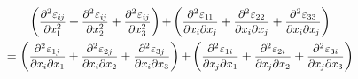 \noindent
{}

\nopagebreak\vspace{-0.2em}
\begin{multline*}
\biggl(
\scalebox{.9}{$ \displaystyle \frac{\partial^2 \infinitesimaldeformationcomponents{i\hspace{-0.1ex}j}}{\partial x_1^2} $}
+ \scalebox{.9}{$ \displaystyle \frac{\partial^2 \infinitesimaldeformationcomponents{i\hspace{-0.1ex}j}}{\partial x_2^2} $}
+ \scalebox{.9}{$ \displaystyle \frac{\partial^2 \infinitesimaldeformationcomponents{i\hspace{-0.1ex}j}}{\partial x_3^2} $}
\biggr)
\hspace{-0.2ex} + \hspace{-0.2ex}
\biggl(
\scalebox{.9}{$ \displaystyle \frac{\partial^2 \infinitesimaldeformationcomponents{1\hspace{-0.1ex}1}}{\partial x_{i} \partial x_{\hspace{-0.1ex}j}} $}
+ \scalebox{.9}{$ \displaystyle \frac{\partial^2 \infinitesimaldeformationcomponents{22}}{\partial x_{i} \partial x_{\hspace{-0.1ex}j}} $}
+ \scalebox{.9}{$ \displaystyle \frac{\partial^2 \infinitesimaldeformationcomponents{33}}{\partial x_{i} \partial x_{\hspace{-0.1ex}j}} $}
\biggr)
\\
%
=
\biggl(
\scalebox{.9}{$ \displaystyle \frac{\partial^2 \infinitesimaldeformationcomponents{1 j}}{\partial x_{i} \partial x_{1}} $}
+ \scalebox{.9}{$ \displaystyle \frac{\partial^2 \infinitesimaldeformationcomponents{2 j}}{\partial x_{i} \partial x_{2}} $}
+ \scalebox{.9}{$ \displaystyle \frac{\partial^2 \infinitesimaldeformationcomponents{3 j}}{\partial x_{i} \partial x_{3}} $}
\biggr)
\hspace{-0.2ex} + \hspace{-0.2ex}
\biggl(
\scalebox{.9}{$ \displaystyle \frac{\partial^2 \infinitesimaldeformationcomponents{1 i}}{\partial x_{\hspace{-0.1ex}j} \partial x_{1}} $}
+ \scalebox{.9}{$ \displaystyle \frac{\partial^2 \infinitesimaldeformationcomponents{2 i}}{\partial x_{\hspace{-0.1ex}j} \partial x_{2}} $}
+ \scalebox{.9}{$ \displaystyle \frac{\partial^2 \infinitesimaldeformationcomponents{3 i}}{\partial x_{\hspace{-0.1ex}j} \partial x_{3}} $}
\biggr)
\end{multline*}

